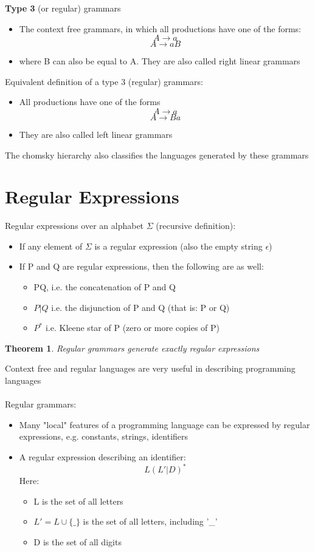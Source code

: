 \documentclass{article}[18pt]
\newtheorem{theorem}{Theorem}
\begin{document}
\textbf{Type 3} (or regular) grammars
\begin{itemize}
	\item The context free grammars, in which all productions have one of the forms:
$$A\rightarrow a$$
$$A\rightarrow aB$$
	\item where B can also be equal to A. They are also called right linear grammars
\end{itemize}
Equivalent definition of a type 3 (regular) grammars:
\begin{itemize}
	\item All productions have one of the forms
	$$A\rightarrow a$$
	$$A\rightarrow Ba$$
	\item They are also called left linear grammars
\end{itemize}
The chomsky hierarchy also classifies the languages generated by these grammars
\section{Regular Expressions}
Regular expressions over an alphabet $\Sigma$ (recursive definition):
\begin{itemize}
	\item If any element of $\Sigma$ is a regular expression (also the empty string $\epsilon$)
	\item If P and Q are regular expressions, then the following are as well:
	\begin{itemize}
		\item PQ, i.e. the concatenation of P and Q
		\item $P|Q$ i.e. the disjunction of P and Q (that is: P or Q)
		\item $P^*$ i.e. Kleene star of P (zero or more copies of P)
	\end{itemize}
\end{itemize}
\begin{theorem}
	Regular grammars generate exactly regular expressions
\end{theorem}
Context free and regular languages are very useful in describing programming languages\\
\\
Regular grammars:
\begin{itemize}
	\item Many "local" features of a programming language can be expressed by regular expressions, e.g. constants, strings, identifiers
	\item A regular expression describing an identifier:
	$$L(L'|D)^*$$
	Here:
	\begin{itemize}
		\item L is the set of all letters
		\item $L'=L\cup \{\_\}$ is the set of all letters, including '\_'
		\item D is the set of all digits
	\end{itemize}
\end{itemize}
\end{document}
